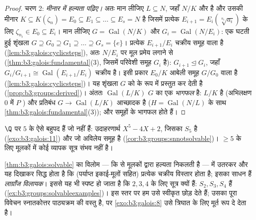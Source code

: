 \begin{proof}
चरण 2: \emph{ मीनार में हल्यता पढ़िए।} अतः मान लीजिए
$L \subseteq N$, जहाँ $N/K$  और  है और उसकी मीनार $K
\subseteq K(\zeta_n) = E_0 \subseteq E_1 \subseteq \dots
\subseteq E_s = N$ है
जिसमें प्रत्येक $E_{i+1} = E_i(\sqrt[n_i]{a_i})$ के लिए $\zeta_{n_i} \in E_0 \subseteq E_i$। मान लीजिए $G =
\operatorname{Gal}(N/K)$ और $G_i = \operatorname{Gal}(N/E_i)$:
एक घटती हुई शृंखला $G \supseteq G_0 \supseteq G_1 \supseteq
\dots \supseteq G_s = \{e\}$। प्रत्येक $E_{i+1}/E_i$ चक्रीय समूह वाला 
है (\cref{lem:b3:galois:cyclicsteps}), अतः  $N/E_i$ पर मूल प्रमेय लगाने से
(\cref{thm:b3:galois:fundamental}(3), जिसमें परिवेशी समूह $G_i$ है): $G_{i+1} \trianglelefteq G_i$, जहाँ $G_i/G_{i+1} \cong
\operatorname{Gal}(E_{i+1}/E_i)$
चक्रीय है। इसी प्रकार $E_0/K$ आबेली समूह $G/G_0$ वाला  है
(\cref{lem:b3:galois:cyclicsteps})। यह शृंखला $G$ को  के रूप में प्रस्तुत कर देती है
(\cref{prop:b3:groups:derived})। अंततः $\operatorname{Gal}(L/K)$ $G$ का एक \emph{भागफल} है: $L/K$ 
है (अभिलक्षण $0$ में $P$ ) और प्रतिबंध $G
\to \operatorname{Gal}(L/K)$ आच्छादक
है ($H =
\operatorname{Gal}(N/L)$ के साथ \cref{thm:b3:galois:fundamental}(3)); और  समूहों के भागफल  होते
हैं।
\end{proof}

\begin{corollary}[पंचघात की अहल्यता]
\label{cor:b3:galois:quintic}
$\Q$ पर  $5$ के ऐसे बहुपद हैं जो  नहीं
हैं: उदाहरणार्थ $X^5 - 4X + 2$, जिसका  $S_5$ है (\cref{exo:b3:galois:11}) और जो
अविलेय समूह है (\cref{cor:b3:groups:snnotsolvable})।  $\geq 5$ के लिए मूलकों में कोई व्यापक
सूत्र संभव नहीं है।
\end{corollary}

\begin{remark}\label{rem:b3:galois:converse}
\cref{thm:b3:galois:solvable} का विलोम --- कि   से मूलकों द्वारा हल्यता
निकलती है ---  में उतरकर और यह दिखाकर सिद्ध होता
है कि (पर्याप्त इकाई-मूलों सहित) प्रत्येक चक्रीय विस्तार 
होता है; इसका साधन हैं \emph{लाग्राँज विलायक}। इससे यह भी स्पष्ट
हो जाता है कि  $2, 3, 4$ के लिए सूत्र क्यों हैं: $S_2, S_3, S_4$  हैं
(\cref{ex:b3:groups:solvableexamples})। इस स्तर पर हम उसे स्वीकृत छोड़ देते हैं; उसका पूरा
विवेचन स्नातकोत्तर पाठ्यक्रम की वस्तु है, पर \cref{exo:b3:galois:8} उसे त्रिघात
के लिए मूर्त रूप दे देता है।
\end{remark}

